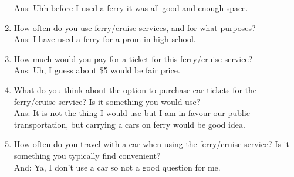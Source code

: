 \begin{enumerate}
Ans: Uhh before I used a ferry it was all good and enough space.
    \item How often do you use ferry/cruise services, and for what purposes?\\
Ans: I have used a ferry for a prom in high school.
    \item How much would you pay for a ticket for this ferry/cruise service?\\
Ans: Uh, I guess about \$5 would be fair price.
    \item What do you think about the option to purchase car tickets for the ferry/cruise service? Is it something you would use?\\
Ans: It is not the thing I would use but I am in favour our public transportation, but carrying a cars on ferry would be good idea.
    \item How often do you travel with a car when using the ferry/cruise service? Is it something you typically find convenient?\\
And: Ya, I don't use a car so not a good question for me.

\end{enumerate}